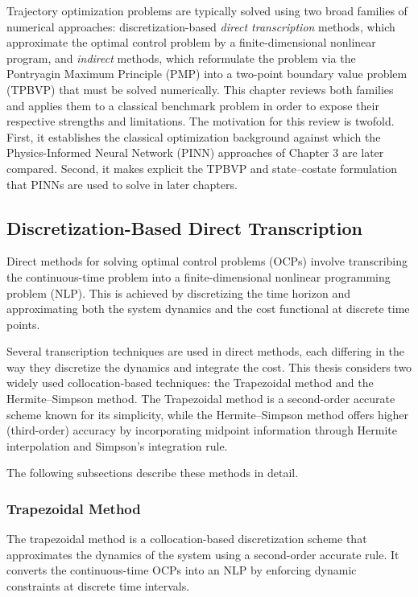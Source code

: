 \documentclass[
  number,
  preprint]{elsarticle}
\begin{document}
Trajectory optimization problems are typically solved using two broad
families of numerical approaches: discretization-based \emph{direct
transcription} methods, which approximate the optimal control problem by
a finite-dimensional nonlinear program, and \emph{indirect} methods,
which reformulate the problem via the Pontryagin Maximum Principle (PMP)
into a two-point boundary value problem (TPBVP) that must be solved
numerically. This chapter reviews both families and applies them to a
classical benchmark problem in order to expose their respective
strengths and limitations. The motivation for this review is twofold.
First, it establishes the classical optimization background against
which the Physics-Informed Neural Network (PINN) approaches of Chapter 3
are later compared. Second, it makes explicit the TPBVP and
state--costate formulation that PINNs are used to solve in later
chapters.

\subsection{Discretization-Based Direct
Transcription}\label{discretization-based-direct-transcription}

Direct methods for solving optimal control problems (OCPs) involve
transcribing the continuous-time problem into a finite-dimensional
nonlinear programming problem (NLP). This is achieved by discretizing
the time horizon and approximating both the system dynamics and the cost
functional at discrete time points.

Several transcription techniques are used in direct methods, each
differing in the way they discretize the dynamics and integrate the
cost. This thesis considers two widely used collocation-based
techniques: the Trapezoidal method and the Hermite--Simpson method. The
Trapezoidal method is a second-order accurate scheme known for its
simplicity, while the Hermite--Simpson method offers higher
(third-order) accuracy by incorporating midpoint information through
Hermite interpolation and Simpson's integration rule.

The following subsections describe these methods in detail.

\subsubsection{Trapezoidal Method}\label{trapezoidal-method}

The trapezoidal method is a collocation-based discretization scheme that
approximates the dynamics of the system using a second-order accurate
rule. It converts the continuous-time OCPs into an NLP by enforcing
dynamic constraints at discrete time intervals.
\end{document}
